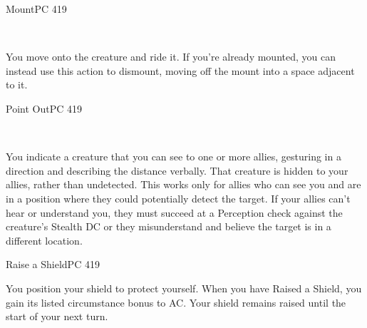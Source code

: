 \documentclass[12pt,openany,twocolumn]{book}
\begin{document}
\begin{action}{Mount}{}{PC 419}
    \begin{actioninfo}
         \\
    \end{actioninfo}

    \begin{actionbody}
        You move onto the creature and ride it. If you're already mounted, you can instead use this action to dismount, moving off the mount into a space adjacent to it.
    \end{actionbody}
\end{action}

\begin{action}{Point Out}{}{PC 419}
    \begin{actioninfo}
         \\
    \end{actioninfo}

    \begin{actionbody}
        You indicate a creature that you can see to one or more allies, gesturing in a direction and describing the distance verbally. That creature is hidden to your allies, rather than undetected. This works only for allies who can see you and are in a position where they could potentially detect the target. If your allies can't hear or understand you, they must succeed at a Perception check against the creature's Stealth DC or they misunderstand and believe the target is in a different location.
    \end{actionbody}
\end{action}

\begin{action}{Raise a Shield}{}{PC 419}
    \begin{actioninfo}
    \end{actioninfo}

    \begin{actionbody}
        You position your shield to protect yourself. When you have Raised a Shield, you gain its listed circumstance bonus to AC. Your shield remains raised until the start of your next turn.
    \end{actionbody}
\end{action}
\end{document}
